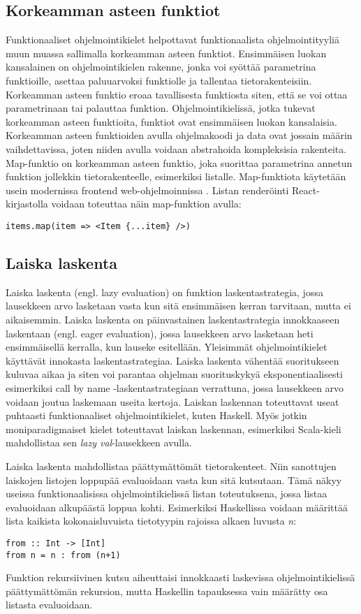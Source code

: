 \subsection{Korkeamman asteen funktiot}
Funktionaaliset ohjelmointikielet helpottavat funktionaalista ohjelmointityyliä muun muassa sallimalla korkeamman asteen
funktiot. Ensimmäisen luokan kansalainen on ohjelmointikielen rakenne, jonka voi syöttää parametrina funktioille,
asettaa paluuarvoksi funktiolle ja tallentaa tietorakenteisiin. Korkeamman asteen funktio eroaa tavallisesta funktiosta
siten, että se voi ottaa parametrinaan tai palauttaa funktion. Ohjelmointikielissä, jotka tukevat korkeamman asteen
funktioita, funktiot ovat ensimmäisen luokan kansalaisia. Korkeamman asteen funktioiden avulla ohjelmakoodi ja data ovat
jossain määrin vaihdettavissa, joten niiden avulla voidaan abstrahoida kompleksisia rakenteita. \cite{hudak} Map-funktio
on korkeamman asteen funktio, joka suorittaa parametrina annetun funktion jollekkin tietorakenteelle, esimerkiksi
listalle. Map-funktiota käytetään usein modernissa frontend web-ohjelmoinnissa \cite{functionalreact}. Listan
renderöinti React-kirjastolla voidaan toteuttaa näin map-funktion avulla:
\begin{verbatim}
items.map(item => <Item {...item} />)
\end{verbatim}

\subsection{Laiska laskenta}
Laiska laskenta (engl. lazy evaluation) on funktion laskentastrategia, jossa lausekkeen arvo lasketaan vasta kun sitä
ensimmäisen kerran tarvitaan, mutta ei aikaisemmin. Laiska laskenta on päinvastainen laskentastrategia innokkaaseen
laskentaan (engl. eager evaluation), jossa lausekkeen arvo lasketaan heti ensimmäisellä kerralla, kun lauseke
esitellään. Yleisimmät ohjelmointikielet käyttävät innokasta laskentastrategiaa. Laiska laskenta vähentää suoritukseen
kuluvaa aikaa ja siten voi parantaa ohjelman suorituskykyä eksponentiaalisesti esimerkiksi call by name
-laskentastrategiaan verrattuna, jossa lausekkeen arvo voidaan joutua laskemaan useita kertoja. Laiskan laskennan
toteuttavat useat puhtaasti funktionaaliset ohjelmointikielet, kuten Haskell. Myös jotkin moniparadigmaiset kielet
toteuttavat laiskan laskennan, esimerkiksi Scala-kieli mahdollistaa sen \textit{lazy val}-lausekkeen avulla.
\cite{languagedesign}

Laiska laskenta mahdollistaa päättymättömät tietorakenteet. Niin sanottujen laiskojen listojen loppupää evaluoidaan
vasta kun sitä kutsutaan. Tämä näkyy useissa funktionaalisissa ohjelmointikielissä listan toteutuksena, jossa listaa
evaluoidaan alkupäästä loppua kohti. Esimerkiksi Haskellissa voidaan määrittää lista kaikista kokonaisluvuista
tietotyypin rajoissa alkaen luvusta \textit{n}:
\begin{verbatim}
from :: Int -> [Int]
from n = n : from (n+1)
\end{verbatim}
Funktion rekursiivinen kutsu aiheuttaisi innokkaasti laskevissa ohjelmointikielissä päättymättömän rekursion, mutta
Haskellin tapauksessa vain määrätty osa listasta evaluoidaan. \cite{languagedesign}

